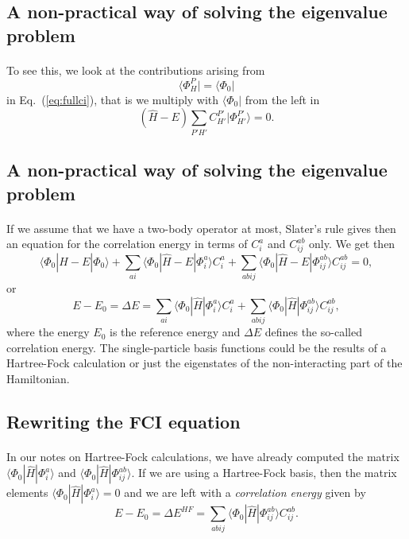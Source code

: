 \documentclass[%
oneside,                 %
final,                   %
10pt]{article}
\begin{document}
\subsection*{A non-practical way of solving the eigenvalue problem}

\paragraph{}
To see this, we look at the contributions arising from 
\[
\langle \Phi_H^P | = \langle \Phi_0|
\]
in  Eq.~(\ref{eq:fullci}), that is we multiply with $\langle \Phi_0 |$
from the left in 
\[
(\hat{H} -E)\sum_{P'H'}C_{H'}^{P'}|\Phi_{H'}^{P'} \rangle=0. 
\]



\subsection*{A non-practical way of solving the eigenvalue problem}

\paragraph{}
If we assume that we have a two-body operator at most, Slater's rule gives then an equation for the 
correlation energy in terms of $C_i^a$ and $C_{ij}^{ab}$ only.  We get then
\[
\langle \Phi_0 | \hat{H} -E| \Phi_0\rangle + \sum_{ai}\langle \Phi_0 | \hat{H} -E|\Phi_{i}^{a} \rangle C_{i}^{a}+
\sum_{abij}\langle \Phi_0 | \hat{H} -E|\Phi_{ij}^{ab} \rangle C_{ij}^{ab}=0,
\]
or 
\[
E-E_0 =\Delta E=\sum_{ai}\langle \Phi_0 | \hat{H}|\Phi_{i}^{a} \rangle C_{i}^{a}+
\sum_{abij}\langle \Phi_0 | \hat{H}|\Phi_{ij}^{ab} \rangle C_{ij}^{ab},
\]
where the energy $E_0$ is the reference energy and $\Delta E$ defines the so-called correlation energy.
The single-particle basis functions  could be the results of a Hartree-Fock calculation or just the eigenstates of the non-interacting part of the Hamiltonian.



\subsection*{Rewriting the FCI equation}

\paragraph{}
In our notes on Hartree-Fock calculations, 
we have already computed the matrix $\langle \Phi_0 | \hat{H}|\Phi_{i}^{a}\rangle $ and $\langle \Phi_0 | \hat{H}|\Phi_{ij}^{ab}\rangle$.  If we are using a Hartree-Fock basis, then the matrix elements
$\langle \Phi_0 | \hat{H}|\Phi_{i}^{a}\rangle=0$ and we are left with a \emph{correlation energy} given by
\[
E-E_0 =\Delta E^{HF}=\sum_{abij}\langle \Phi_0 | \hat{H}|\Phi_{ij}^{ab} \rangle C_{ij}^{ab}. 
\]
\end{document}
